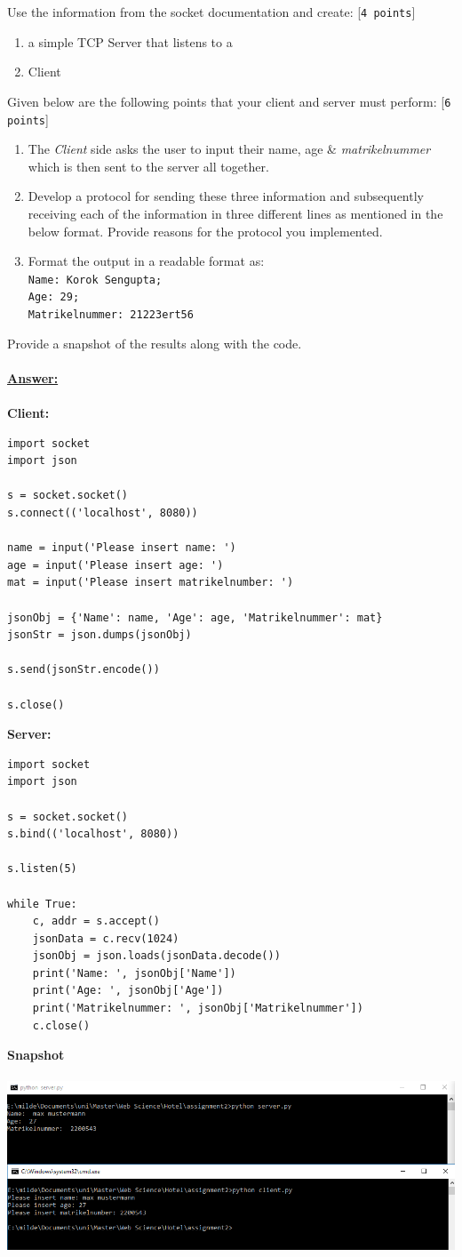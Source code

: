 \documentclass{scrartcl}
\begin{document}
Use the information from the socket documentation and create: [\texttt{4 points}]
\begin{enumerate}
\item a simple TCP Server that listens to a
\item Client
\end{enumerate}
Given below are the following points that your client and server must perform: [\texttt{6 points}]
\begin{enumerate}
\item The \emph{Client} side asks the user to input their name, age \& \emph{matrikelnummer} which is then sent to the server all together.
\item Develop a protocol for sending these three information and subsequently receiving each of the information in three different lines as mentioned in the below format. Provide reasons for the protocol you implemented. 
\item Format the output in a readable format as:\texttt{\\ Name: Korok Sengupta; \\ Age: 29; \\ Matrikelnummer: 21223ert56}
\end{enumerate}

Provide a snapshot of the results along with the code. \\
\\
\textbf{\underline{Answer:}}\\
\\
\textbf{Client:}

\begin{lstlisting}
import socket
import json

s = socket.socket()
s.connect(('localhost', 8080))

name = input('Please insert name: ')
age = input('Please insert age: ')
mat = input('Please insert matrikelnumber: ')

jsonObj = {'Name': name, 'Age': age, 'Matrikelnummer': mat}
jsonStr = json.dumps(jsonObj)

s.send(jsonStr.encode())

s.close()
\end{lstlisting}
\newpage
\textbf{Server:}

\begin{lstlisting}
import socket
import json

s = socket.socket()
s.bind(('localhost', 8080))

s.listen(5)

while True:
	c, addr = s.accept()
	jsonData = c.recv(1024)
	jsonObj = json.loads(jsonData.decode())
	print('Name: ', jsonObj['Name'])
	print('Age: ', jsonObj['Age'])
	print('Matrikelnummer: ', jsonObj['Matrikelnummer'])
	c.close()
\end{lstlisting}

\textbf{Snapshot}\\
\\
\includegraphics[width=1.5\textwidth]{screenshot1.png}
\end{document}
